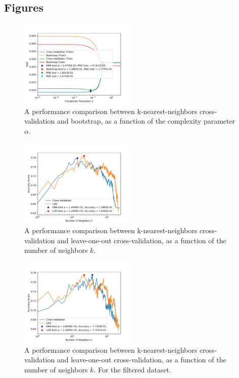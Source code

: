 \documentclass[twoside,twocolumn,10pt]{revtex4-1}
\begin{document}
	\subsection{Figures}
	
	\begin{figure}[H]
	\centering  
	\includegraphics[width = 0.5\textwidth]{plot_1.pdf}
	\caption{A performance comparison between k-nearest-neighbors cross-validation and bootstrap, as a function of the complexity parameter $\alpha$.\label{fig_1}}
	\end{figure}
	
	\begin{figure}[H]
	\centering  
	\includegraphics[width = 0.5\textwidth]{plot_2.pdf}
	\caption{A performance comparison between k-nearest-neighbors cross-validation and leave-one-out cross-validation, as a function of the number of neighbors $k$.\label{fig_2}}
	\end{figure}
	
	\begin{figure}[H]
	\centering  
	\includegraphics[width = 0.5\textwidth]{plot_3.pdf}
	\caption{A performance comparison between k-nearest-neighbors cross-validation and leave-one-out cross-validation, as a function of the number of neighbors $k$. For the filtered dataset.\label{fig_3}}
	\end{figure}
	
\end{document}
